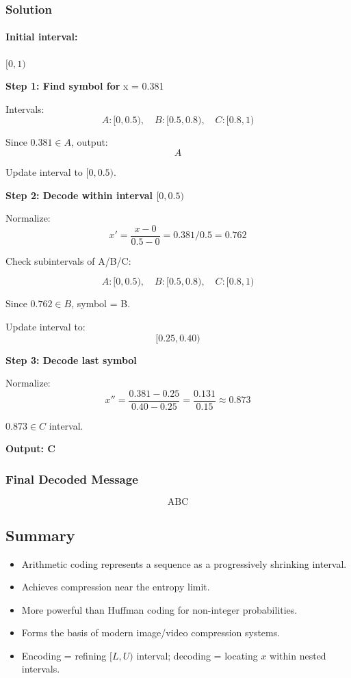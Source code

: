 \documentclass{AnantDocumentation}
\begin{document}
\subsubsection*{Solution}

\paragraph{Initial interval:} \([0,1)\)

\textbf{Step 1: Find symbol for } x = 0.381

Intervals:
\[
A:[0,0.5),\quad B:[0.5,0.8),\quad C:[0.8,1)
\]

Since \(0.381 \in A\), output:
\[
A
\]

Update interval to \([0,0.5)\).

\textbf{Step 2: Decode within interval \([0,0.5)\)}

Normalize:
\[
x' = \frac{x - 0}{0.5 - 0} = 0.381 / 0.5 = 0.762
\]

Check subintervals of A/B/C:

\[
A:[0,0.5),\quad B:[0.5,0.8),\quad C:[0.8,1)
\]

Since \(0.762 \in B\), symbol = B.

Update interval to:
\[
[0.25, 0.40)
\]

\textbf{Step 3: Decode last symbol}

Normalize:
\[
x'' = \frac{0.381 - 0.25}{0.40 - 0.25} = \frac{0.131}{0.15} \approx 0.873
\]

\(0.873 \in C\) interval.

\textbf{Output: C}

\subsubsection*{Final Decoded Message}

\[
\boxed{\text{ABC}}
\]

\subsection{Summary}

\begin{itemize}
\item Arithmetic coding represents a sequence as a progressively shrinking interval.
\item Achieves compression near the entropy limit.
\item More powerful than Huffman coding for non-integer probabilities.
\item Forms the basis of modern image/video compression systems.
\item Encoding = refining \([L,U)\) interval; decoding = locating \(x\) within nested intervals.
\end{itemize}
\end{document}
